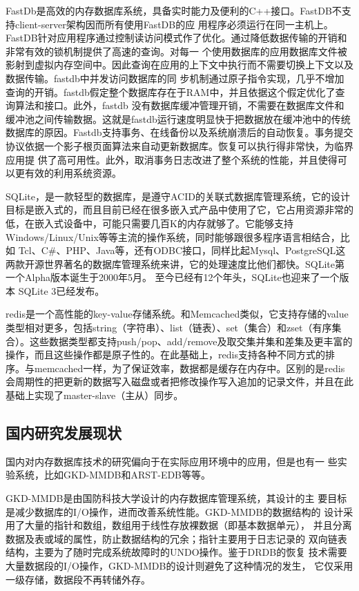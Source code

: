 \documentclass[proposal]{zjutreport}
\begin{document}
FastDb是高效的内存数据库系统，具备实时能力及便利的C++接口。FastDB不支持client-server架构因而所有使用FastDB的应 用程序必须运行在同一主机上。FastDB针对应用程序通过控制读访问模式作了优化。通过降低数据传输的开销和非常有效的锁机制提供了高速的查询。对每一 个使用数据库的应用数据库文件被影射到虚拟内存空间中。因此查询在应用的上下文中执行而不需要切换上下文以及数据传输。fastdb中并发访问数据库的同 步机制通过原子指令实现，几乎不增加查询的开销。fastdb假定整个数据库存在于RAM中，并且依据这个假定优化了查询算法和接口。此外，fastdb 没有数据库缓冲管理开销，不需要在数据库文件和缓冲池之间传输数据。这就是fastdb运行速度明显快于把数据放在缓冲池中的传统数据库的原因。Fastdb支持事务、在线备份以及系统崩溃后的自动恢复。事务提交协议依据一个影子根页面算法来自动更新数据库。恢复可以执行得非常快，为临界应用提 供了高可用性。此外，取消事务日志改进了整个系统的性能，并且使得可以更有效的利用系统资源。

SQLite，是一款轻型的数据库，是遵守ACID的关联式数据库管理系统，它的设计目标是嵌入式的，而且目前已经在很多嵌入式产品中使用了它，它占用资源非常的低，在嵌入式设备中，可能只需要几百K的内存就够了。它能够支持Windows/Linux/Unix等等主流的操作系统，同时能够跟很多程序语言相结合，比如 Tcl、C\#、PHP、Java等，还有ODBC接口，同样比起Mysql、PostgreSQL这两款开源世界著名的数据库管理系统来讲，它的处理速度比他们都快。SQLite第一个Alpha版本诞生于2000年5月。 至今已经有12个年头，SQLite也迎来了一个版本 SQLite 3已经发布。

redis是一个高性能的key-value存储系统。和Memcached类似，它支持存储的value类型相对更多，包括string（字符串）、list（链表）、set（集合）和zset（有序集合）。这些数据类型都支持push/pop、add/remove及取交集并集和差集及更丰富的操作，而且这些操作都是原子性的。在此基础上，redis支持各种不同方式的排序。与memcached一样，为了保证效率，数据都是缓存在内存中。区别的是redis会周期性的把更新的数据写入磁盘或者把修改操作写入追加的记录文件，并且在此基础上实现了master-slave（主从）同步。

\subsection{国内研究发展现状}
国内对内存数据库技术的研究偏向于在实际应用环境中的应用，但是也有一
些实验系统，比如GKD-MMDB和ARST-EDB等等。

GKD-MMDB是由国防科技大学设计的内存数据库管理系统，其设计的主
要目标是减少数据库的I/O操作，进而改善系统性能。GKD-MMDB的数据结构的
设计采用了大量的指针和数组，数组用于线性存放裸数据（即基本数据单元），
并且分离数据及表或域的属性，防止数据结构的冗余；指针主要用于日志记录的
双向链表结构，主要为了随时完成系统故障时的UNDO操作。鉴于DRDB的恢复
技术需要大量数据段的I/O操作，GKD-MMDB的设计则避免了这种情况的发生，
它仅采用一级存储，数据段不再转储外存。
\end{document}
